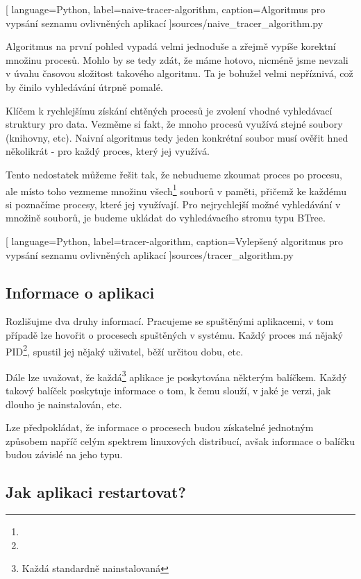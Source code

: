 \documentclass[10pt,a4paper]{article}
\begin{document}
		
		[
			language={Python},
			label=naive-tracer-algorithm,
			caption={Algoritmus pro vypsání seznamu ovlivněných aplikací}
		]{sources/naive_tracer_algorithm.py}

		Algoritmus na první pohled vypadá velmi jednoduše a zřejmě vypíše korektní množinu procesů. Mohlo by se tedy zdát, že máme hotovo, nicméně jsme nevzali v úvahu časovou složitost takového algoritmu. Ta je bohužel velmi nepříznivá, což by činilo vyhledávání útrpně pomalé.


		Klíčem k rychlejšímu získání chtěných procesů je zvolení vhodné vyhledávací struktury pro data. Vezměme si fakt, že mnoho procesů využívá stejné soubory (knihovny, etc). Naivní algoritmus tedy jeden konkrétní soubor musí ověřit hned několikrát - pro každý proces, který jej využívá.

		Tento nedostatek můžeme řešit tak, že nebudueme zkoumat proces po procesu, ale místo toho vezmeme množinu všech\footnote{} souborů v paměti, přičemž ke každému si poznačíme procesy, které jej využívají. Pro nejrychlejší možné vyhledávání v množině souborů, je budeme ukládat do vyhledávacího stromu typu BTree.

		
		[
			language={Python},
			label=tracer-algorithm,
			caption={Vylepšený algoritmus pro vypsání seznamu ovlivněných aplikací}
		]{sources/tracer_algorithm.py}


		\subsection{Informace o aplikaci}
		Rozlišujme dva druhy informací. Pracujeme se spuštěnými aplikacemi, v tom případě lze hovořit o procesech spuštěných v systému. Každý proces má nějaký PID\footnote{}, spustil jej nějaký uživatel, běží určitou dobu, etc.

		Dále lze uvažovat, že každá\footnote{Každá standardně nainstalovaná} aplikace je poskytována některým balíčkem. Každý takový balíček poskytuje informace o tom, k čemu slouží, v jaké je verzi, jak dlouho je nainstalován, etc.

		Lze předpokládat, že informace o procesech budou získatelné jednotným způsobem napříč celým spektrem linuxových distribucí, avšak informace o balíčku budou závislé na jeho typu.

		\subsection{Jak aplikaci restartovat?}
\end{document}
